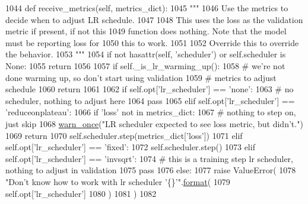 \begin{DoxyCode}
1044     \textcolor{keyword}{def }receive\_metrics(self, metrics\_dict):
1045         \textcolor{stringliteral}{"""}
1046 \textcolor{stringliteral}{        Use the metrics to decide when to adjust LR schedule.}
1047 \textcolor{stringliteral}{}
1048 \textcolor{stringliteral}{        This uses the loss as the validation metric if present, if not this}
1049 \textcolor{stringliteral}{        function does nothing. Note that the model must be reporting loss for}
1050 \textcolor{stringliteral}{        this to work.}
1051 \textcolor{stringliteral}{}
1052 \textcolor{stringliteral}{        Override this to override the behavior.}
1053 \textcolor{stringliteral}{        """}
1054         \textcolor{keywordflow}{if} \textcolor{keywordflow}{not} hasattr(self, \textcolor{stringliteral}{'scheduler'}) \textcolor{keywordflow}{or} self.scheduler \textcolor{keywordflow}{is} \textcolor{keywordtype}{None}:
1055             \textcolor{keywordflow}{return}
1056 
1057         \textcolor{keywordflow}{if} self.\_is\_lr\_warming\_up():
1058             \textcolor{comment}{# we're not done warming up, so don't start using validation}
1059             \textcolor{comment}{# metrics to adjust schedule}
1060             \textcolor{keywordflow}{return}
1061 
1062         \textcolor{keywordflow}{if} self.opt[\textcolor{stringliteral}{'lr\_scheduler'}] == \textcolor{stringliteral}{'none'}:
1063             \textcolor{comment}{# no scheduler, nothing to adjust here}
1064             \textcolor{keywordflow}{pass}
1065         \textcolor{keywordflow}{elif} self.opt[\textcolor{stringliteral}{'lr\_scheduler'}] == \textcolor{stringliteral}{'reduceonplateau'}:
1066             \textcolor{keywordflow}{if} \textcolor{stringliteral}{'loss'} \textcolor{keywordflow}{not} \textcolor{keywordflow}{in} metrics\_dict:
1067                 \textcolor{comment}{# nothing to step on, just skip}
1068                 \hyperlink{namespaceparlai_1_1utils_1_1misc_a884a3aefa90581f53bc592fa6a78dc43}{warn\_once}(\textcolor{stringliteral}{"LR scheduler expected to see loss metric, but didn't."})
1069                 \textcolor{keywordflow}{return}
1070             self.scheduler.step(metrics\_dict[\textcolor{stringliteral}{'loss'}])
1071         \textcolor{keywordflow}{elif} self.opt[\textcolor{stringliteral}{'lr\_scheduler'}] == \textcolor{stringliteral}{'fixed'}:
1072             self.scheduler.step()
1073         \textcolor{keywordflow}{elif} self.opt[\textcolor{stringliteral}{'lr\_scheduler'}] == \textcolor{stringliteral}{'invsqrt'}:
1074             \textcolor{comment}{# this is a training step lr scheduler, nothing to adjust in validation}
1075             \textcolor{keywordflow}{pass}
1076         \textcolor{keywordflow}{else}:
1077             \textcolor{keywordflow}{raise} ValueError(
1078                 \textcolor{stringliteral}{"Don't know how to work with lr scheduler '\{\}'"}.\hyperlink{namespaceparlai_1_1chat__service_1_1services_1_1messenger_1_1shared__utils_a32e2e2022b824fbaf80c747160b52a76}{format}(
1079                     self.opt[\textcolor{stringliteral}{'lr\_scheduler'}]
1080                 )
1081             )
1082 
\end{DoxyCode}
